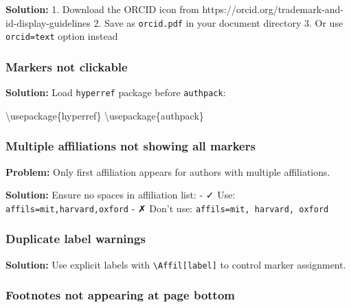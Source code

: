 \documentclass[
]{article}
\newenvironment{Shaded}{}{}
\newcommand{\BuiltInTok}[1]{#1}
\newcommand{\ExtensionTok}[1]{#1}
\newcommand{\NormalTok}[1]{#1}
\begin{document}
\textbf{Solution:} 1. Download the ORCID icon from
https://orcid.org/trademark-and-id-display-guidelines 2. Save as
\texttt{orcid.pdf} in your document directory 3. Or use
\texttt{orcid=text} option instead

\hypertarget{markers-not-clickable}{%
\subsubsection{Markers not clickable}\label{markers-not-clickable}}

\textbf{Solution:} Load \texttt{hyperref} package before
\texttt{authpack}:

\begin{Shaded}
\begin{Highlighting}[]
\BuiltInTok{\textbackslash{}usepackage}\NormalTok{\{}\ExtensionTok{hyperref}\NormalTok{\}}
\BuiltInTok{\textbackslash{}usepackage}\NormalTok{\{}\ExtensionTok{authpack}\NormalTok{\}}
\end{Highlighting}
\end{Shaded}

\hypertarget{multiple-affiliations-not-showing-all-markers}{%
\subsubsection{Multiple affiliations not showing all
markers}\label{multiple-affiliations-not-showing-all-markers}}

\textbf{Problem:} Only first affiliation appears for authors with
multiple affiliations.

\textbf{Solution:} Ensure no spaces in affiliation list: - ✓ Use:
\texttt{affils=mit,harvard,oxford} - ✗ Don't use:
\texttt{affils=mit,\ harvard,\ oxford}

\hypertarget{duplicate-label-warnings}{%
\subsubsection{Duplicate label
warnings}\label{duplicate-label-warnings}}

\textbf{Solution:} Use explicit labels with
\texttt{\textbackslash{}Affil{[}label{]}} to control marker assignment.

\hypertarget{footnotes-not-appearing-at-page-bottom}{%
\subsubsection{Footnotes not appearing at page
bottom}\label{footnotes-not-appearing-at-page-bottom}}
\end{document}
